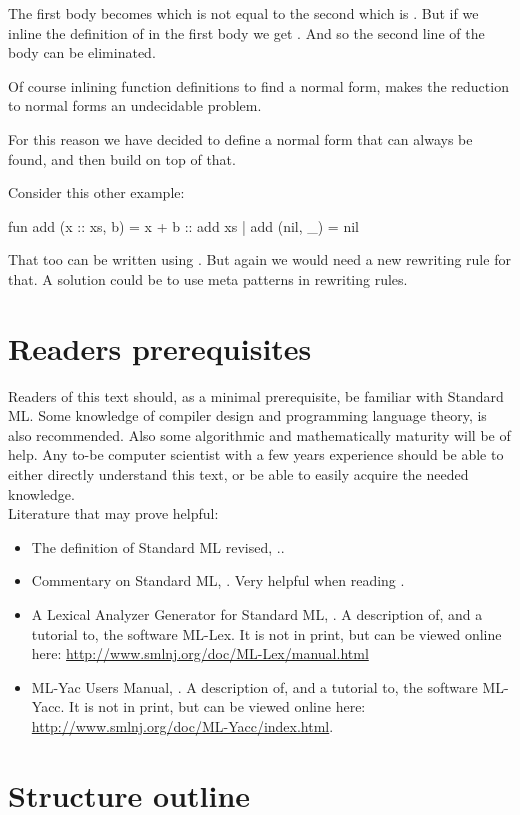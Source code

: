 The first body becomes  which is not equal to the
second which is . But if we inline the definition of
 in the first body we get . And so the
second line of the body can be eliminated.

Of course inlining function definitions to find a normal form, makes the
reduction to normal forms an undecidable problem.

For this reason we have decided to define a normal form that can always be
found, and then build on top of that.

Consider this other example:
\begin{sml}
fun add (x :: xs, b) = x + b :: add xs
  | add (nil, _)     = nil
\end{sml}
That too can be written using . But again we would need a new
rewriting rule for that. A solution could be to use meta patterns in rewriting
rules.


\section{Readers prerequisites}

Readers of this text should, as a minimal prerequisite, be familiar with
Standard ML. Some knowledge of compiler design and programming language theory,
is also recommended. Also some algorithmic and mathematically maturity will be
of help. Any to-be computer scientist with a few years experience should be able
to either directly understand this text, or be able to easily acquire the needed
knowledge.\\

\noindent
Literature that may prove helpful:

\begin{itemize}
\item {The definition of Standard ML revised, \cite{SML97}.}.
\item {Commentary on Standard ML, \cite{SMLCOMM}.} Very helpful when reading
  \cite{SML97}.
\item {A Lexical Analyzer Generator for Standard ML, \cite{MLLEX}.} A
  description of, and a tutorial to, the software ML-Lex. It is not in print,
  but can be viewed online here:
  \url{http://www.smlnj.org/doc/ML-Lex/manual.html}
\item {ML-Yac Users Manual, \cite{MLYACC}.} A description of, and a tutorial to, the
  software ML-Yacc. It is not in print, but can be viewed online here:
  \url{http://www.smlnj.org/doc/ML-Yacc/index.html}.
\end{itemize}


\section{Structure outline}


